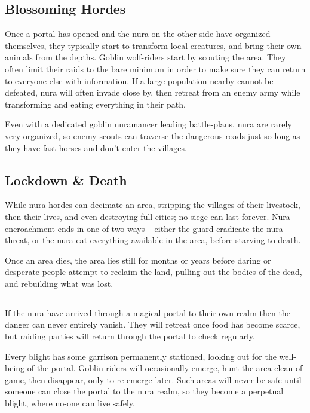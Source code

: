 \begin{multicols}{2}
\subsection{Blossoming Hordes}

Once a portal has opened and the nura on the other side have organized themselves, they typically start to transform local creatures, and bring their own animals from the depths.
Goblin wolf-riders start by scouting the area.
They often limit their raids to the bare minimum in order to make sure they can return to everyone else with information.
If a large population nearby cannot be defeated, nura will often invade close by, then retreat from an enemy army while transforming and eating everything in their path.

Even with a dedicated goblin nuramancer leading battle-plans, nura are rarely very organized, so enemy scouts can traverse the dangerous roads just so long as they have fast horses and don't enter the villages.

\subsection{Lockdown \& Death}

While nura hordes can decimate an area, stripping the villages of their livestock, then their lives, and even destroying full cities; no siege can last forever. 
Nura encroachment ends in one of two ways -- either the \gls{guard} eradicate the nura threat, or the nura eat everything available in the area, before starving to death.

Once an area dies, the area lies still for months or years before daring or desperate people attempt to reclaim the land, pulling out the bodies of the dead, and rebuilding what was lost.

\subsection{}
\label{blight}

If the nura have arrived through a magical portal to their own realm then the danger can never entirely vanish.
They will retreat once food has become scarce, but raiding parties will return through the portal to check regularly.

Every \gls{blight} has some garrison permanently stationed, looking out for the well-being of the portal.
Goblin riders will occasionally emerge, hunt the area clean of game, then disappear, only to re-emerge later.
Such areas will never be safe until someone can close the portal to the nura realm, so they become a perpetual \gls{blight}, where no-one can live safely.


\end{multicols}
